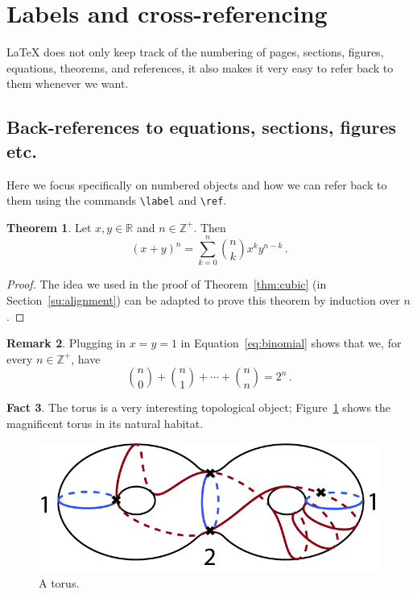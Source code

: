 \documentclass[11pt,letterpaper,titlepage]{article}
\numberwithin{equation}{section}
\numberwithin{figure}{section}
\numberwithin{table}{section}
\numberwithin{algorithm}{section}
\theoremstyle{definition}
\newtheorem{theorem}{Theorem}[section] %
\newtheorem{fact}[theorem]{Fact} %
\newtheorem{remark}[theorem]{Remark}
\newcommand{\Z}{\mathbb{Z}}
\newcommand{\R}{\mathbb{R}}
\begin{document}
\section{Labels and cross-referencing}

{\LaTeX} does not only keep track of the numbering of pages, sections, figures, equations, theorems, and references, it also makes it very easy to refer back to them whenever we want.

\subsection{Back-references to equations, sections, figures etc.}
Here we focus specifically on numbered objects and how we can refer back to them using the commands \verb$\label$ and \verb$\ref$.
 
\begin{theorem}
    \label{thm:binomial}
    Let $x,y\in\R$ and $n\in\Z^+$. Then
    \begin{equation}
        \label{eq:binomial}
        (x+y)^n=\sum_{k=0}^n\binom{n}{k}x^ky^{n-k}\,.
    \end{equation}
\end{theorem}    

\begin{proof}
    The idea we used in the proof of Theorem~\ref{thm:cubic} (in Section~\ref{su:alignment}) can be adapted to prove this theorem by induction over $n$.  
\end{proof}

\begin{remark}
Plugging in $x=y=1$ in Equation~\ref{eq:binomial} shows that we, for every $n\in\Z^+$, have 
\[\binom{n}{0}+\binom{n}{1}+\cdots+\binom{n}{n}=2^n\,.\]
\end{remark}

\begin{fact}
    The torus is a very interesting topological object; Figure~\ref{fig:torus} shows the magnificent torus in its natural habitat.
\end{fact}

\begin{figure}[H]
    \centering
    \includegraphics[width=0.3\linewidth]{top1}
    \caption{A torus.}
    \label{fig:torus}
\end{figure}
    
\end{document}
